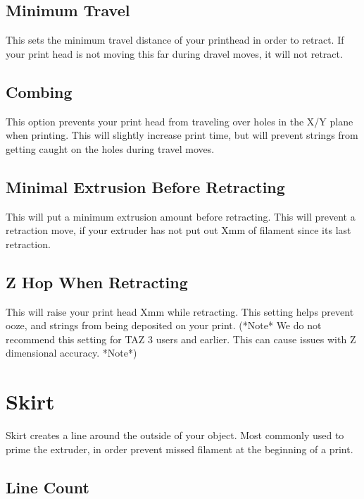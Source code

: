 \subsection{Minimum Travel}

This sets the minimum travel distance of your printhead in order to retract. If your print head is not moving this far during dravel moves, it will not retract.

\subsection{Combing}

This option prevents your print head from traveling over holes in the X/Y plane when printing. This will slightly increase print time, but will prevent strings from getting caught on the holes during travel moves.

\subsection{Minimal Extrusion Before Retracting}

This will put a minimum extrusion amount before retracting. This will prevent a retraction move, if your extruder has not put out Xmm of filament since its last retraction.

\subsection{Z Hop When Retracting}

This will raise your print head Xmm while retracting. This setting helps prevent ooze, and strings from being deposited on your print. (*Note* We do not recommend this setting for TAZ 3 users and earlier. This can cause issues with Z dimensional accuracy. *Note*)

\section{Skirt}

Skirt creates a line around the outside of your object. Most commonly used to prime the extruder, in order prevent missed filament at the beginning of a print.

\subsection{Line Count}

